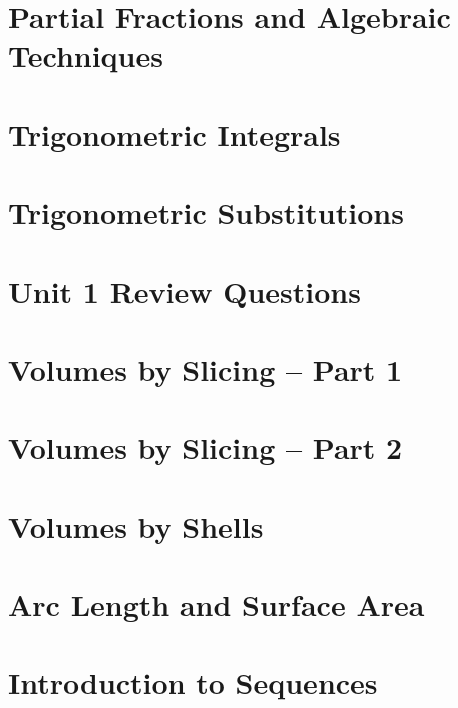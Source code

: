 \documentclass[twoside, addpoints, 12pt, letterpage]{exam}
\begin{document}
\section{Partial Fractions and Algebraic Techniques}
\cleardoublepage

\section{Trigonometric Integrals}
\cleardoublepage

\section{Trigonometric Substitutions}
\cleardoublepage

\section{Unit 1 Review Questions}
\cleardoublepage

\section{Volumes by Slicing -- Part 1}
\cleardoublepage

\section{Volumes by Slicing -- Part 2}
\cleardoublepage

\section{Volumes by Shells}
\cleardoublepage

\section{Arc Length and Surface Area}
\cleardoublepage

\section{Introduction to Sequences}
\cleardoublepage
\end{document}
